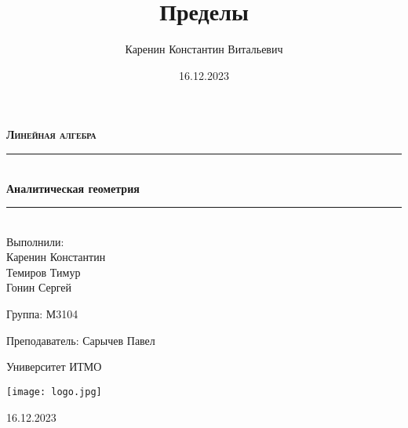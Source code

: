 \documentclass{article}
\title{Пределы}
\author{Каренин Константин Витальевич}
\date{16.12.2023}
\begin{document}
\begin{titlepage}
    \centering
    \vspace*{0.5 cm}
    
    \textsc{\LARGE \textbf{Линейная алгебра}}
    \vspace{1.5cm}
    
    \rule{\linewidth}{0.2 mm} \\[0.4 cm]
    { \huge \bfseries Аналитическая геометрия}
    \rule{\linewidth}{0.2 mm} \\[1.5 cm]
    
    \Large Выполнили: \\
    Каренин Константин \\
    Темиров Тимур \\
    Гонин Сергей \\
    
    \vspace{0.5cm}
    
    Группа: М3104
    
    \vspace{0.5cm}
    
    Преподаватель: Сарычев Павел
    
    \vspace{0.5cm}
    
    Университет ИТМО
    
    \vfill

    \texttt{[image: logo.jpg]}
    
    16.12.2023
    
\end{titlepage}

\setcounter{page}{2}

\newpage
\end{document}
